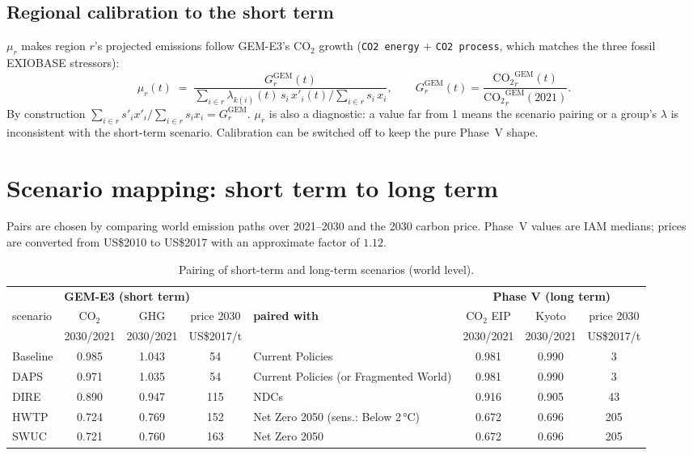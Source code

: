 \documentclass[11pt,a4paper]{article}
\newcommand{\var}[1]{\texttt{#1}}
\begin{document}
\subsection{Regional calibration to the short term}
\label{sec:calib}

$\mu_r$ makes region $r$'s projected emissions follow GEM-E3's CO$_2$ growth
(\var{CO2 energy} $+$ \var{CO2 process}, which matches the three fossil
EXIOBASE stressors):
\begin{equation}
  \mu_r(t) \;=\; \frac{G^{\mathrm{GEM}}_r(t)}
  {\displaystyle \sum_{i\in r} \lambda_{k(i)}(t)\, s_i\, x'_i(t) \Big/ \sum_{i\in r} s_i\, x_i},
  \qquad
  G^{\mathrm{GEM}}_r(t) = \frac{\mathrm{CO_2}^{\mathrm{GEM}}_r(t)}{\mathrm{CO_2}^{\mathrm{GEM}}_r(2021)} .
\end{equation}
By construction $\sum_{i\in r} s'_i x'_i \big/ \sum_{i\in r} s_i x_i = G^{\mathrm{GEM}}_r$.
$\mu_r$ is also a diagnostic: a value far from 1 means the scenario pairing or
a group's $\lambda$ is inconsistent with the short-term scenario. Calibration
can be switched off to keep the pure Phase~V shape.

\section{Scenario mapping: short term to long term}
\label{sec:scenarios}

Pairs are chosen by comparing world emission paths over 2021--2030 and the 2030
carbon price. Phase~V values are IAM medians; prices are converted from
US\$2010 to US\$2017 with an approximate factor of $1.12$.

\begin{table}[h]
\centering\footnotesize
\begin{tabular}{@{}lccc l ccc@{}}
\toprule
\multicolumn{4}{c}{\textbf{GEM-E3 (short term)}} & & \multicolumn{3}{c}{\textbf{Phase V (long term)}}\\
\cmidrule(r){1-4}\cmidrule(l){6-8}
scenario & CO$_2$ & GHG & price 2030 & \textbf{paired with} & CO$_2$ EIP & Kyoto & price 2030\\
 & 2030/2021 & 2030/2021 & US\$2017/t & & 2030/2021 & 2030/2021 & US\$2017/t\\
\midrule
Baseline & 0.985 & 1.043 & 54  & Current Policies              & 0.981 & 0.990 & 3\\
DAPS     & 0.971 & 1.035 & 54  & Current Policies (or Fragmented World) & 0.981 & 0.990 & 3\\
DIRE     & 0.890 & 0.947 & 115 & NDCs                          & 0.916 & 0.905 & 43\\
HWTP     & 0.724 & 0.769 & 152 & Net Zero 2050 (sens.: Below 2\,°C) & 0.672 & 0.696 & 205\\
SWUC     & 0.721 & 0.760 & 163 & Net Zero 2050                 & 0.672 & 0.696 & 205\\
\bottomrule
\end{tabular}
\caption{Pairing of short-term and long-term scenarios (world level).}
\label{tab:scen}
\end{table}
\end{document}

